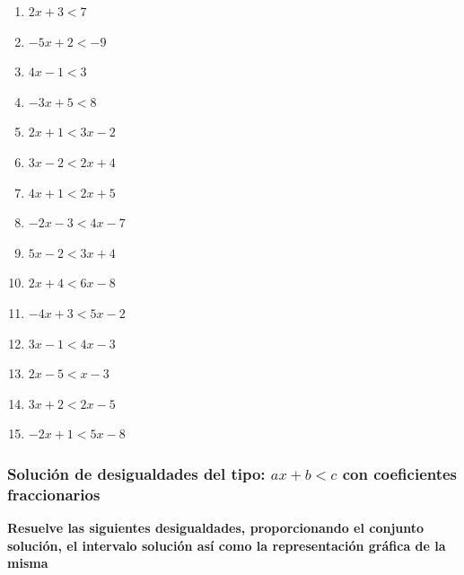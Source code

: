 \documentclass[12pt]{article}
\begin{document}
\begin{enumerate}
\def\labelenumi{\arabic{enumi}.}
\item
  \(2x+3<7\)
\item
  \(-5x+2<-9\)
\item
  \(4x-1<3\)
\item
  \(-3x+5<8\)
\item
  \(2x+1<3x-2\)
\item
  \(3x-2<2x+4\)
\item
  \(4x+1<2x+5\)
\item
  \(-2x-3<4x-7\)
\item
  \(5x-2<3x+4\)
\item
  \(2x+4<6x-8\)
\item
  \(-4x+3<5x-2\)
\item
  \(3x-1<4x-3\)
\item
  \(2x-5<x-3\)
\item
  \(3x+2<2x-5\)
\item
  \(-2x+1<5x-8\)
\end{enumerate}

\subsubsection{\texorpdfstring{Solución de desigualdades del tipo:
\(ax+b<c\) con coeficientes
fraccionarios}{Solución de desigualdades del tipo: ax+b\textless c con coeficientes fraccionarios}}\label{soluciuxf3n-de-desigualdades-del-tipo-axbc-con-coeficientes-fraccionarios-1}

\textbf{Resuelve las siguientes desigualdades, proporcionando el
conjunto solución, el intervalo solución así como la representación
gráfica de la misma}
\end{document}
